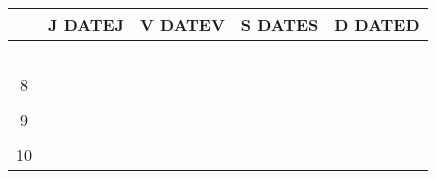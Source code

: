         \section*{\phantom{Lorem}}
        \begin{tabularx}{\linewidth}{|c|X|X|c|c|}
            \hline
          & \textbf{J} DATEJ & \textbf{V} DATEV & \textbf{S} \tiny{DATES} &   \textbf{D} \tiny{DATED}\\
          \hline 
          \hline 
          \phantom{aa}&\phantom{Lorem ipsum dolor sit amet, consectetur}  &  \phantom{Lorem ipsum dolor sit amet, consectetur}    & \phantom{Lorem ipsum} & \phantom{Lorem ipsum} \\
          \phantom{aa}&\phantom{Lorem ipsum dolor sit amet, consectetur}  &  \phantom{Lorem ipsum dolor sit amet, consectetur}    & \phantom{Lorem ipsum} & \phantom{Lorem ipsum} \\
          \phantom{aa}&\phantom{Lorem ipsum dolor sit amet, consectetur}  &  \phantom{Lorem ipsum dolor sit amet, consectetur}    & \phantom{Lorem ipsum} & \phantom{Lorem ipsum} \\
          \phantom{aa}&\phantom{Lorem ipsum dolor sit amet, consectetur}  &  \phantom{Lorem ipsum dolor sit amet, consectetur}    & \phantom{Lorem ipsum} & \phantom{Lorem ipsum} \\
          \phantom{aa}&\phantom{Lorem ipsum dolor sit amet, consectetur}  &  \phantom{Lorem ipsum dolor sit amet, consectetur}    & \phantom{Lorem ipsum} & \phantom{Lorem ipsum} \\
          \hline
          \hline 
          8&\phantom{Lorem ipsum dolor sit amet, consectetur}  &  \phantom{Lorem ipsum dolor sit amet, consectetur}               & \phantom{Lorem ipsum} & \phantom{Lorem ipsum } \\
          \phantom{aa}&\phantom{Lorem ipsum dolor sit amet, consectetur}  &  \phantom{Lorem ipsum dolor sit amet, consectetur}    & \phantom{Lorem ipsum} & \phantom{Lorem ipsum} \\
          \hline
          9&\phantom{Lorem ipsum dolor sit amet, consectetur}  &  \phantom{Lorem ipsum dolor sit amet, consectetur}               & \phantom{Lorem ipsum} & \phantom{Lorem ipsum }\\
          \phantom{aa}&\phantom{Lorem ipsum dolor sit amet, consectetur}  &  \phantom{Lorem ipsum dolor sit amet, consectetur}    & \phantom{Lorem ipsum}  & \phantom{Lorem ipsum }\\
          \hline
          10&\phantom{Lorem ipsum dolor sit amet, consectetur}  &  \phantom{Lorem ipsum dolor sit amet, consectetur}              & \phantom{Lorem ipsum}  & \phantom{Lorem ipsum }\\

\end{tabularx}
